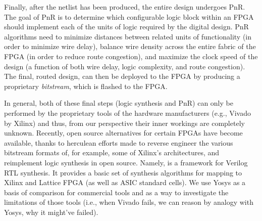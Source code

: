 Finally, after the netlist has been produced, the entire design undergoes PnR.
The goal of PnR is to determine which configurable logic block within an FPGA should implement each of the units of logic required by the digital design.
PnR algorithms need to minimize distances between related units of functionality (in order to minimize wire delay), balance wire density across the entire fabric of the FPGA (in order to reduce route congestion), and maximize the clock speed of the design (a function of both wire delay, logic complexity, and route congestion).
The final, routed design, can then be deployed to the FPGA by producing a proprietary \emph{bitstream}, which is flashed to the FPGA.

In general, both of these final steps (logic synthesis and PnR) can only be performed by the proprietary tools of the hardware manufacturers (e.g., Vivado by Xilinx) and thus, from our perspective their inner workings are completely unknown.
Recently, open source alternatives for certain FPGAs have become available, thanks to herculean efforts made to reverse engineer the various bitstream formats of, for example, some of Xilinx's architectures\cite{6546003}, and reimplement logic synthesis in open source.
Namely, \cite{wolf2013yosys} is a framework for Verilog RTL synthesis.
It provides a basic set of synthesis algorithms for mapping to Xilinx and Lattice FPGA (as well as ASIC standard cells).
We use Yosys as a basis of comparison for commercial tools and as a way to investigate the limitations of those tools (i.e., when Vivado fails, we can reason by analogy with Yosys, why it might've failed).